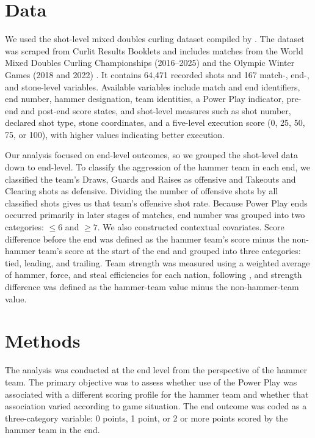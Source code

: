 \documentclass[titlepage, 12pt]{article}
\begin{document}
\section{Data}\label{sec:data}

We used the shot-level mixed doubles curling dataset compiled by
\citet{ritchie2025opening}. The dataset was scraped from Curlit Results
Booklets and includes matches from the World Mixed Doubles Curling
Championships (2016--2025) and the Olympic Winter Games (2018 and 2022)
\citep{ritchie2025opening}. It contains 64{,}471 recorded shots and 167 match-,
end-, and stone-level variables. Available variables include match and end
identifiers, end number, hammer designation, team identities, a Power Play
indicator, pre-end and post-end score states, and shot-level measures such as
shot number, declared shot type, stone coordinates, and a five-level execution
score (0, 25, 50, 75, or 100), with higher values indicating better execution.

Our analysis focused on end-level outcomes, so we grouped the shot-level data
down to end-level. To classify the aggression of the hammer team in each end,
we classified the team's Draws, Guards and Raises as offensive and Takeouts and
Clearing shots as defensive. Dividing the number of offensive shots by all
classified shots gives us that team's offensive shot rate. Because Power Play
ends occurred primarily in later stages of matches, end number was grouped into
two categories: $\leq 6$ and $\geq 7$. We also constructed contextual
covariates. Score difference before the end was defined as the hammer team's
score minus the non-hammer team's score at the start of the end and grouped
into three categories: tied, leading, and trailing. Team strength was measured
using a weighted average of hammer, force, and steal efficiencies for each
nation, following \citet{ritchie2025opening}, and strength difference was
defined as the hammer-team value minus the non-hammer-team value.

\section{Methods}\label{sec:meth}

The analysis was conducted at the end level from the perspective of the hammer
team. The primary objective was to assess whether use of the Power Play was
associated with a different scoring profile for the hammer team and whether
that association varied according to game situation. The end outcome was coded
as a three-category variable: 0 points, 1 point, or 2 or more points scored by
the hammer team in the end.
\end{document}
